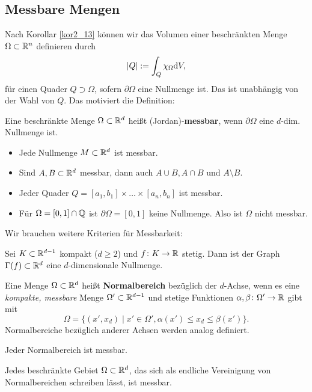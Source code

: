 \subsection{Messbare Mengen}
Nach Korollar \ref{kor2_13} können wir das Volumen einer beschränkten Menge $\Omega \subset \mathbb{R}^n$ definieren durch
\[|Q| := \int_Q \chi_\Omega \mathrm{d} V,\]
für einen Quader $Q \supset \Omega$, sofern $\partial \Omega$ eine Nullmenge ist. Das ist unabhängig von der Wahl von $Q$. Das motiviert die Definition:

Eine beschränkte Menge $\Omega \subset \mathbb{R}^d$ heißt (Jordan)-\textbf{messbar}, wenn $\partial \Omega$ eine $d$-dim. Nullmenge ist.
\begin{itemize}
	\item Jede Nullmenge $M \subset \mathbb{R}^d$ ist messbar.
	\item Sind $A,B \subset \mathbb{R}^d$ messbar, dann auch $A\cup B, A \cap B$ und $A \setminus B$.
	\item Jeder Quader $Q = [a_1, b_1] \times \dots \times [a_n, b_n]$ ist messbar.
	\item Für $\Omega = [0,1] \cap \mathbb{Q}$ ist $\partial\Omega = [0,1]$ keine Nullmenge. Also ist $\Omega$ nicht messbar.
\end{itemize}
Wir brauchen weitere Kriterien für Messbarkeit:
\begin{satz}\label{satz2_14}
	Sei $K \subset \mathbb{R}^{d-1}$ kompakt ($d \geq 2$) und $f \colon K \to \mathbb{R}$ stetig. Dann ist der Graph $\Gamma(f) \subset \mathbb{R}^d$ eine $d$-dimensionale Nullmenge.
\end{satz}
Eine Menge $\Omega \subset \mathbb{R}^d$ heißt \textbf{Normalbereich} bezüglich der $d$-Achse, wenn es eine \textit{kompakte, messbare} Menge $\Omega' \subset \mathbb{R}^{d-1}$ und stetige Funktionen $\alpha, \beta \colon \Omega' \to \mathbb{R}$ gibt mit
\[\Omega = \{(x', x_d) \mid x' \in \Omega', \alpha(x') \leq x_d \leq \beta(x')\}.\]
Normalbereiche bezüglich anderer Achsen werden analog definiert.
\begin{satz}\label{satz2_15}
	Jeder Normalbereich ist messbar.
\end{satz}
\begin{folgerung}
	Jedes beschränkte Gebiet $\Omega \subset \mathbb{R}^d$, das sich als endliche Vereinigung von Normalbereichen schreiben lässt, ist messbar.
\end{folgerung}

